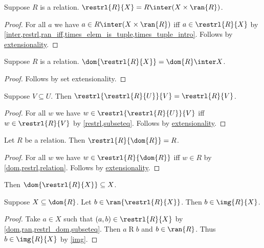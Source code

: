 \begin{proposition}\label{restrl_eq_inter}
    Suppose $R$ is a relation.
    $\restrl{R}{X} = R\inter (X\times \ran{R})$.
\end{proposition}
\begin{proof}
    For all $a$ we have $a\in R\inter (X\times \ran{R})$ iff $a\in \restrl{R}{X}$
        by \cref{inter,restrl,ran_iff,times_elem_is_tuple,times_tuple_intro}.
    Follows by \hyperref[setext]{extensionality}.
\end{proof}

\begin{corollary}%
\label{dom_of_restrl_eq_inter}
    Suppose $R$ is a relation.
    $\dom{\restrl{R}{X}} = \dom{R}\inter X$.
\end{corollary}
\begin{proof}
    Follows by set extensionality.
\end{proof}

\begin{proposition}\label{restrl_restrl}
    Suppose $V\subseteq U$.
    Then $\restrl{\restrl{R}{U}}{V} = \restrl{R}{V}$.
\end{proposition}
\begin{proof}
    For all $w$ we have $w\in\restrl{\restrl{R}{U}}{V}$ iff $w\in\restrl{R}{V}$
        by \cref{restrl,subseteq}.
    Follows by \hyperref[setext]{extensionality}.
\end{proof}

\begin{proposition}\label{restrl_by_dom}
    Let $R$ be a relation.
    Then $\restrl{R}{\dom{R}} = R$.
\end{proposition}
\begin{proof}
    For all $w$ we have $w\in\restrl{R}{\dom{R}}$ iff $w\in R$
        by \cref{dom,restrl,relation}.
    Follows by \hyperref[setext]{extensionality}.
\end{proof}

\begin{proposition}\label{restrl_dom}
    Then $\dom{\restrl{R}{X}}\subseteq X$.
\end{proposition}

\begin{proposition}\label{restrl_ran_elim}
    Suppose $X\subseteq\dom{R}$.
    Let $b\in\ran{\restrl{R}{X}}$.
    Then $b\in\img{R}{X}$.
\end{proposition}
\begin{proof}
    Take $a\in X$ such that $(a, b)\in \restrl{R}{X}$
        by \cref{dom,ran,restrl_dom,subseteq}.
    Then $a\mathrel{R} b$ and $b\in\ran{R}$.
    Thus $b\in\img{R}{X}$ by \cref{img}.
\end{proof}

